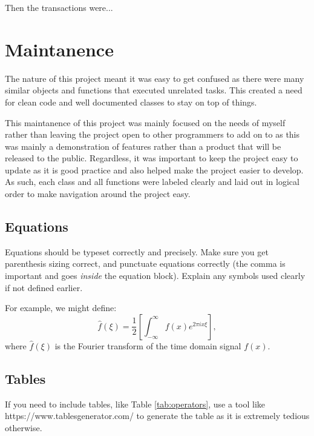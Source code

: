 \documentclass{l4proj}
\begin{document}
Then the transactions were...




\section{Maintanence}
The nature of this project meant it was easy to get confused as there were many similar objects and functions 
that executed unrelated tasks. This created a need for clean code and well documented classes to stay on top 
of things.

This maintanence of this project was mainly focused on the needs of myself rather than leaving the project open
to other programmers to add on to as this was mainly a demonstration of features rather than a product that will
be released to the public. Regardless, it was important to keep the project easy to update as it is good practice
and also helped make the project easier to develop. As such, each class and all functions were labeled clearly
and laid out in logical order to make navigation around the project easy.


\clearpage

\subsection{Equations}

Equations should be typeset correctly and precisely. Make sure you get parenthesis sizing correct, and punctuate equations correctly 
(the comma is important and goes \textit{inside} the equation block). Explain any symbols used clearly if not defined earlier. 

For example, we might define:
\begin{equation}
    \hat{f}(\xi) = \frac{1}{2}\left[ \int_{-\infty}^{\infty} f(x) e^{2\pi i x \xi} \right],
\end{equation}    
where $\hat{f}(\xi)$ is the Fourier transform of the time domain signal $f(x)$.

\subsection{Tables}

If you need to include tables, like Table \ref{tab:operators}, use a tool like https://www.tablesgenerator.com/ to generate the table as it is
extremely tedious otherwise. 
\end{document}

